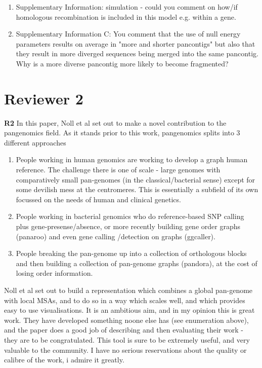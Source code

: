\documentclass{article}
\newcommand{\review}[1]{\textbf{#1}}
\begin{document}
\begin{enumerate}
    \item Supplementary Information: simulation - could you comment on how/if homologous recombination is included in this model e.g. within a gene.

    \item Supplementary Information C: You comment that the use of null energy parameters results on average in "more and shorter pancontigs" but also that they result in more diverged sequences being merged into the same pancontig. Why is a more diverse pancontig more likely to become fragmented?
\end{enumerate}


\section*{Reviewer 2}

\review{R2} In this paper, Noll et al set out to make a novel contribution to the pangenomics field. As it stands prior to this work, pangenomics splits into 3 different approaches

\begin{enumerate}
    \item People working in human genomics are working to develop a graph human reference. The challenge there is one of scale - large genomes with comparatively small pan-genomes (in the classical/bacterial sense) except for some devilish mess at the centromeres. This is essentially a subfield of its own focussed on the needs of human and clinical genetics.

    \item People working in bacterial genomics who do reference-based SNP calling plus gene-presense/absence, or more recently building gene order graphs (panaroo) and even gene calling /detection on graphs (ggcaller).

    \item People breaking the pan-genome up into a collection of orthologous blocks and then building a collection of pan-genome graphs (pandora), at the cost of losing order information.
\end{enumerate}


Noll et al set out to build a representation which combines a global pan-genome with local MSAs, and to do so in a way which scales well, and which provides easy to use visualisations. It is an ambitious aim, and in my opinion this is great work. They have developed something noone else has (see enumeration above), and the paper does a good job of describing and then evaluating their work - they are to be congratulated. This tool is sure to be extremely useful, and very valuable to the community. I have no serious reservations about the quality or calibre of the work, i admire it greatly.\\
\end{document}
